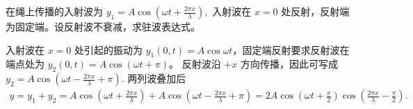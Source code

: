 \begin{exercise}
在绳上传播的入射波为
 \(y_1=A\cos\left(\omega t+\frac{2\pi x}{\lambda}\right),\) 
入射波在 \(x=0\) 处反射，反射端为固定端。设反射波不衰减，求驻波表达式。
\end{exercise}
\begin{solution}
入射波在 \(x=0\) 处引起的振动为 \(y_1(0,t)=A\cos\omega t\)，固定端反射要求反射波在端点处为 \(y_2(0,t)=A\cos(\omega t+\pi)\)。
反射波沿 \(+x\) 方向传播，因此可写成
 \(y_2=A\cos\left(\omega t-\frac{2\pi x}{\lambda}+\pi\right).\) 
两列波叠加后
\[
\begin{aligned}
y=y_1+y_2=A\cos\left(\omega t+\frac{2\pi x}{\lambda}\right)
+A\cos\left(\omega t-\frac{2\pi x}{\lambda}+\pi\right)=2A\cos\left(\omega t+\frac{\pi}{2}\right)
\cos\left(\frac{2\pi x}{\lambda}-\frac{\pi}{2}\right).
\end{aligned}
\]
\end{solution}
